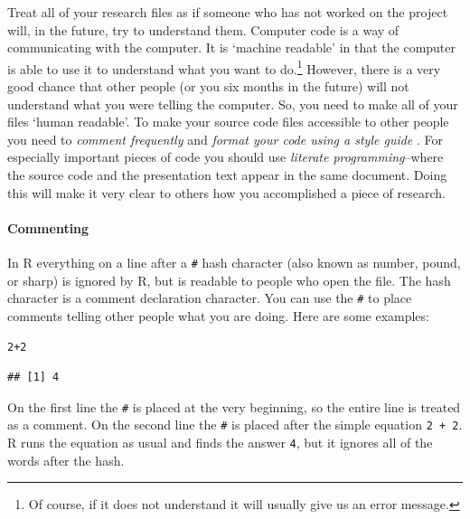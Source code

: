 \documentclass[krantz1]{krantz}
\begin{document}
Treat all of your research files as if someone who has not worked on the project will, in the future, try to understand them. Computer code is a way of communicating with the computer. It is `machine readable' in that the computer is able to use it to understand what you want to do.\footnote{Of course, if it does not understand it will usually give us an error message.} However, there is a very good chance that other people (or you six months in the future) will not understand what you were telling the computer. So, you need to make all of your files `human readable'. To make your source code files accessible to other people you need to {\emph{comment frequently}} \cite[3]{Bowers2011} and {\emph{format your code using a style guide}} \cite[]{Nagler1995}. For especially important pieces of code you should use {\emph{literate programming}}--where the source code and the presentation text appear in the same document. Doing this will make it very clear to others how you accomplished a piece of research.

\paragraph{Commenting}
In R everything on a line after a {\tt{\#}} hash character (also known as number, pound, or sharp) is ignored by R, but is readable to people who open the file. The hash character is a comment declaration character. You can use the {\tt{\#}} to place comments telling other people what you are doing. Here are some examples:

\begin{knitrout}
\color{fgcolor}\begin{kframe}
\begin{alltt}
2 + 2  
\end{alltt}
\begin{verbatim}
## [1] 4
\end{verbatim}
\end{kframe}
\end{knitrout}


\noindent On the first line the {\tt{\#}} is placed at the very beginning, so the entire line is treated as a comment. On the second line the {\tt{\#}} is placed after the simple equation \texttt{2 + 2}. R runs the equation as usual and finds the answer {\tt{4}}, but it ignores all of the words after the hash. 
\end{document}
